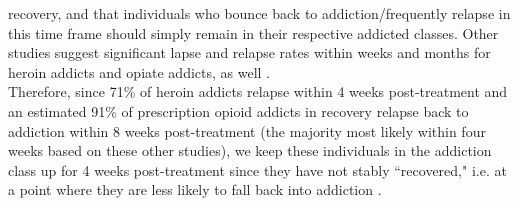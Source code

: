 \documentclass[12pt]{article}
\begin{document}
recovery, and that individuals who bounce back to addiction/frequently relapse in this time frame should simply remain in their respective addicted classes. Other studies suggest significant lapse and relapse rates within weeks and months for heroin addicts and opiate addicts, as well \cite{Hunt, Gossop3}. \\
Therefore, since 71\% of heroin addicts relapse within 4 weeks post-treatment and an estimated 91\% of prescription opioid addicts in recovery relapse back to addiction within 8 weeks post-treatment (the majority most likely within four weeks based on these other studies), we keep these individuals in the addiction class up for 4 weeks post-treatment since they have not stably ``recovered," i.e. at a point where they are less likely to fall back into addiction \cite{Smyth, Weiss}.
\end{document}
